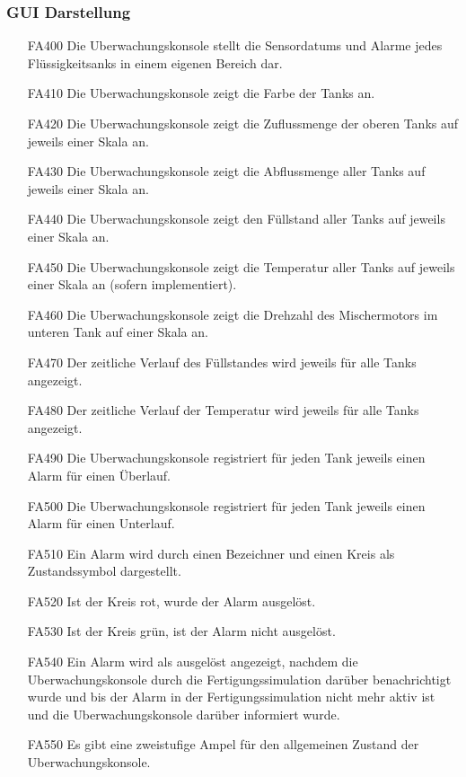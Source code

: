 \documentclass[parskip=full]{scrartcl}
\begin{document}
\subsubsection{GUI Darstellung}
\begin{enumerate}
  \item[FA400] Die \gls{Uberwachungskonsole} stellt die \glspl{Sensordatum} und Alarme jedes Flüssigkeitsanks in einem eigenen Bereich dar.
  \item[FA410] Die \gls{Uberwachungskonsole} zeigt die Farbe der Tanks an.
  \item[FA420] Die \gls{Uberwachungskonsole} zeigt die Zuflussmenge der oberen Tanks auf jeweils einer Skala an.
  \item[FA430] Die \gls{Uberwachungskonsole} zeigt die Abflussmenge aller Tanks auf jeweils einer Skala an.
  \item[FA440] Die \gls{Uberwachungskonsole} zeigt den Füllstand aller Tanks auf jeweils einer Skala an.
  \item[FA450] Die \gls{Uberwachungskonsole} zeigt die Temperatur aller Tanks auf jeweils einer Skala an (sofern implementiert).
  \item[FA460] Die \gls{Uberwachungskonsole} zeigt die Drehzahl des Mischermotors im unteren Tank auf einer Skala an.
  \item[FA470] Der zeitliche Verlauf des Füllstandes wird jeweils für alle Tanks angezeigt.
  \item[FA480] Der zeitliche Verlauf der Temperatur wird jeweils für alle Tanks angezeigt.
  \item[FA490] Die \gls{Uberwachungskonsole} registriert für jeden Tank jeweils einen Alarm für einen Überlauf.
  \item[FA500] Die \gls{Uberwachungskonsole} registriert für jeden Tank jeweils einen Alarm für einen Unterlauf.
  \item[FA510] Ein Alarm wird durch einen Bezeichner und einen Kreis als Zustandssymbol dargestellt.
  \item[FA520] Ist der Kreis rot, wurde der Alarm ausgelöst.
  \item[FA530] Ist der Kreis grün, ist der Alarm nicht ausgelöst.
  \item[FA540] Ein Alarm wird als ausgelöst angezeigt, nachdem die \gls{Uberwachungskonsole} durch die \gls{Fertigungssimulation} darüber benachrichtigt wurde und bis der Alarm in der
    \gls{Fertigungssimulation} nicht mehr aktiv ist und die \gls{Uberwachungskonsole} darüber informiert wurde.
  \item[FA550] Es gibt eine zweistufige Ampel für den allgemeinen Zustand der \gls{Uberwachungskonsole}.

\end{enumerate}
\end{document}
